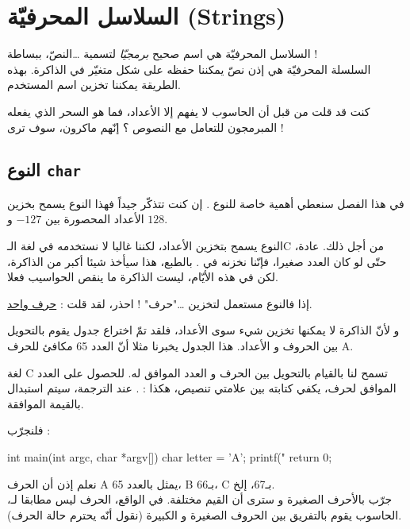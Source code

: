 \chapter{السلاسل المحرفيّة (\textenglish{Strings})}

السلاسل المحرفيّة هي اسم صحيح
\textit{برمجيّا}
لتسمية \dots النصّ، ببساطة !\\
السلسلة المحرفيّة هي إذن نصّ يمكننا حفظه على شكل متغيّر في الذاكرة. بهذه الطريقة يمكننا تخزين اسم المستخدم.

كنت قد قلت من قبل أن الحاسوب لا يفهم إلا الأعداد، فما هو السحر الذي يفعله المبرمجون للتعامل مع النصوص ؟ إنّهم ماكرون، سوف ترى !

\section{النوع \texttt{char}}

في هذا الفصل سنعطي أهمية خاصة للنوع
.
إن كنت تتذكّر جيداً فهذا النوع يسمح بخزين الأعداد المحصورة بين
$-127$
و
$128$.

\begin{information}
  النوع
 يسمح بتخزين الأعداد، لكننا غالبا لا نستخدمه في لغة الـ\textenglish{C}
من أجل ذلك.
عادة، حتّى لو كان العدد صغيرا، فإنّنا نخزنه في
.
بالطبع، هذا سيأخذ  شيئا أكبر من الذاكرة، لكن في هذه الأيّام، ليست الذاكرة ما ينقص الحواسيب فعلا.
\end{information}

إذا فالنوع
مستعمل لتخزين \dots "حرف" ! احذر، لقد قلت :
\underline{حرف واحد}.

و لأنّ الذاكرة لا يمكنها تخزين شيء سوى الأعداد، فلقد تمّ اختراع جدول يقوم بالتحويل بين الحروف و الأعداد. هذا الجدول يخبرنا مثلا أنّ العدد 65 مكافئ للحرف
\textenglish{A}.

لغة
\textenglish{C}
تسمح لنا بالقيام بالتحويل بين الحرف و العدد الموافق له. للحصول على العدد الموافق لحرف، يكفي كتابته بين علامتي تنصيص، هكذا :
.
عند الترجمة، سيتم استبدال
بالقيمة الموافقة.

فلنجرّب :

\begin{Csource}
int main(int argc, char *argv[])
{
	char letter = 'A';
	printf("%
	return 0;
}
\end{Csource}

نعلم إذن أن الحرف
\textenglish{A}
يمثل بالعدد 65،
\textenglish{B}
بـ66،
\textenglish{C}
بـ67، إلخ.\\
جرّب بالأحرف الصغيرة و سترى أن القيم مختلفة. في الواقع، الحرف
ليس مطابقا لـ،
الحاسوب يقوم بالتفريق بين الحروف الصغيرة و الكبيرة (نقول أنّه يحترم حالة الحرف).

